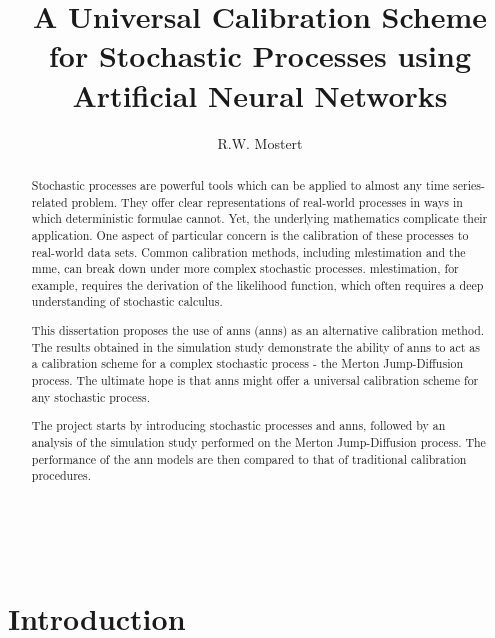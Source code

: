 \documentclass[11pt,oneside,openany,a4paper,english, report, goldenblock
]{usthesis}
\title{A Universal Calibration Scheme for Stochastic Processes using Artificial Neural Networks}
\author{R.W. Mostert}{Rayno Willem Mostert}
\begin{document}
	
	\TitlePage%
	
	\DeclarationPage
	

\
\begin{abstract}
	Stochastic processes are powerful tools which can be applied to almost any time series-related problem. They offer clear representations of real-world processes in ways in which deterministic formulae cannot. Yet, the underlying mathematics complicate their application. One aspect of particular concern is the calibration of these processes to real-world data sets. Common calibration methods, including \acrfull{mlestimation} and the \acrfull{mme}, can break down under more complex stochastic processes. \acrshort{mlestimation}, for example, requires the derivation of the likelihood function, which often requires a deep understanding of stochastic calculus.
	
	This dissertation proposes the use of \acrlong{ann}s (\acrshort{ann}s) as an alternative calibration method. The results obtained in the simulation study demonstrate the ability of \acrshort{ann}s to act as a calibration scheme for a complex stochastic process - the Merton Jump-Diffusion process. The ultimate hope is that \acrshort{ann}s might offer a universal calibration scheme for any stochastic process.
	
	The project starts by introducing stochastic processes and \acrshort{ann}s, followed by an analysis of the simulation study performed on the Merton Jump-Diffusion process. The performance of the \acrshort{ann} models are then compared to that of traditional calibration procedures.
\end{abstract}

\tableofcontents

\listoffigures

\listoftables

\printglossary[type=\acronymtype, title=List of abbreviations and/or acronyms, toctitle=List of abbreviations]
	
\chapter{Introduction} 
\label{chapter:introduction}
\end{document}

